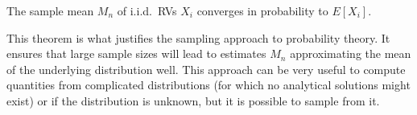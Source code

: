 \begin{prop}
The sample mean $M_n$ of i.i.d.~RVs $X_i$ converges in probability to $E[X_i]$.
\end{prop}
This theorem is what justifies the sampling approach to probability theory. It ensures that large sample sizes will lead to estimates $M_n$ approximating the mean of the underlying distribution well. This approach can be very useful to compute quantities from complicated distributions (for which no analytical solutions might exist) or if the distribution is unknown, but it is possible to sample from it.





